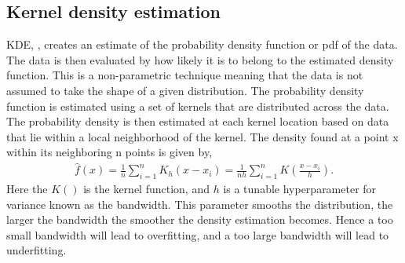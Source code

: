         
        
    
    \subsection{Kernel density estimation}\label{subsec:kde}
        KDE, \cite{Latecki}, creates an estimate of the probability density function or pdf of the data. The data is then evaluated by how likely it is to belong to the estimated density function. This is a non-parametric technique meaning that the data is not assumed to take the shape of a given distribution. The probability density function is estimated using a set of kernels that are distributed across the data. The probability density is then estimated at each kernel location based on data that lie within a local neighborhood of the kernel. The density found at a point x within its neighboring n points is given by, 
        \begin{align}
            \hat{f}(x) = \frac{1}{n} \sum_{i=1}^n K_h(x-x_i)  = \frac{1}{nh} \sum_{i=1}^n K(\frac{x-x_i}{h}).
        \end{align}
        Here the $K()$ is the kernel function, and $h$ is a tunable hyperparameter for variance known as the bandwidth. This parameter smooths the distribution, the larger the bandwidth the smoother the density estimation becomes. Hence a too small bandwidth will lead to overfitting, and a too large bandwidth will lead to underfitting.   
        
